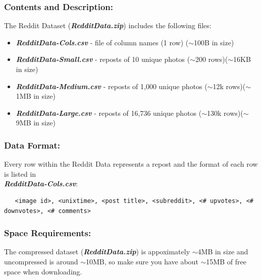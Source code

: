 \documentclass{article}
\begin{document}
\subsubsection*{Contents and Description:}
The Reddit Dataset (\textbf{\textit{RedditData.zip}}) includes the following files:
\begin{itemize}
    \item \textit{\textbf{RedditData-Cols.csv}} - file of column names (1 row) ($\sim$100B in size)
    \item \textit{\textbf{RedditData-Small.csv}} - reposts of 10 unique photos ($\sim$200 rows)($\sim$16KB in size)
    \item \textit{\textbf{RedditData-Medium.csv}} - reposts of 1,000 unique photos ($\sim$12k rows)($\sim$1MB in size)
    \item \textit{\textbf{RedditData-Large.csv}} - reposts of 16,736 unique photos ($\sim$130k rows)($\sim$9MB in size)
\end{itemize}

\subsubsection*{Data Format:}
Every row within the Reddit Data represents a repost and the format of each row is listed in \\ \textbf{\textit{RedditData-Cols.csv}}:
\small
\begin{verbatim}
   <image id>, <unixtime>, <post title>, <subreddit>, <# upvotes>, <# downvotes>, <# comments>
\end{verbatim}
\normalsize

\subsubsection*{Space Requirements:}
The compressed dataset (\textbf{\textit{RedditData.zip}}) is appoximately $\sim$4MB in size and uncompressed is around $\sim$10MB, so make sure you have about $\sim$15MB of free space when downloading.
\end{document}
